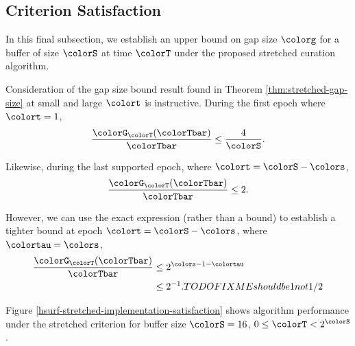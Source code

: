 \subsection{Criterion Satisfaction}

In this final subsection, we establish an upper bound on gap size $\colorg$ for a buffer of size $\colorS$ at time $\colorT$ under the proposed stretched curation algorithm.





Consideration of the gap size bound result found in Theorem \ref{thm:stretched-gap-size} at small and large $\colort$ is instructive.
During the first epoch where $\colort = 1$,
\begin{align*}
\frac{\colorG_{\colorT}(\colorTbar)}{\colorTbar}
\leq
\frac{4}{\colorS}.
\end{align*}

Likewise, during the last supported epoch, where $\colort = \colorS - \colors$,
\begin{align*}
\frac{\colorG_{\colorT}(\colorTbar)}{\colorTbar}
\leq
2.
\end{align*}

However, we can use the exact expression (rather than a bound) to establish a tighter bound at epoch $\colort = \colorS - \colors$, where $\colortau = \colors$,
\begin{align*}
\frac{\colorG_{\colorT}(\colorTbar)}{\colorTbar}
&\leq
2^{\colors - 1 - \colortau}\\
&\leq
2^{- 1}. TODO FIXME should be 1 not 1/2
\end{align*}

Figure \ref{hsurf-stretched-implementation-satisfaction} shows algorithm performance under the stretched criterion for buffer size $\colorS=16$, $0 \leq \colorT < 2^{\colorS}$.

